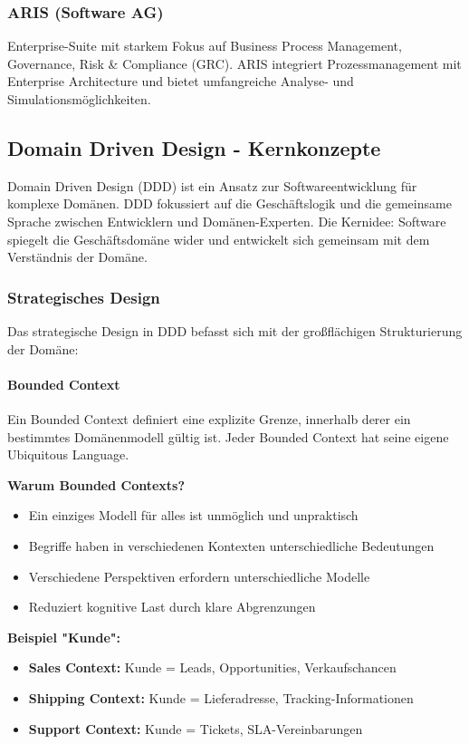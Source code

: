 \subsubsection{ARIS (Software AG)}
\label{subsubsec:aris}

Enterprise-Suite mit starkem Fokus auf Business Process Management, Governance, Risk \& Compliance (GRC). ARIS integriert Prozessmanagement mit Enterprise Architecture und bietet umfangreiche Analyse- und Simulationsmöglichkeiten.

\subsection{Domain Driven Design - Kernkonzepte}
\label{subsec:ddd}

Domain Driven Design (DDD) ist ein Ansatz zur Softwareentwicklung für komplexe Domänen. DDD fokussiert auf die Geschäftslogik und die gemeinsame Sprache zwischen Entwicklern und Domänen-Experten. Die Kernidee: Software spiegelt die Geschäftsdomäne wider und entwickelt sich gemeinsam mit dem Verständnis der Domäne.

\subsubsection{Strategisches Design}
\label{subsubsec:ddd-strategic}

Das strategische Design in DDD befasst sich mit der großflächigen Strukturierung der Domäne:

\paragraph{Bounded Context}
Ein Bounded Context definiert eine explizite Grenze, innerhalb derer ein bestimmtes Domänenmodell gültig ist. Jeder Bounded Context hat seine eigene Ubiquitous Language.

\textbf{Warum Bounded Contexts?}
\begin{itemize}
\item Ein einziges Modell für alles ist unmöglich und unpraktisch
\item Begriffe haben in verschiedenen Kontexten unterschiedliche Bedeutungen
\item Verschiedene Perspektiven erfordern unterschiedliche Modelle
\item Reduziert kognitive Last durch klare Abgrenzungen
\end{itemize}

\textbf{Beispiel "Kunde":}
\begin{itemize}
\item \textbf{Sales Context:} Kunde = Leads, Opportunities, Verkaufschancen
\item \textbf{Shipping Context:} Kunde = Lieferadresse, Tracking-Informationen
\item \textbf{Support Context:} Kunde = Tickets, SLA-Vereinbarungen
\end{itemize}

